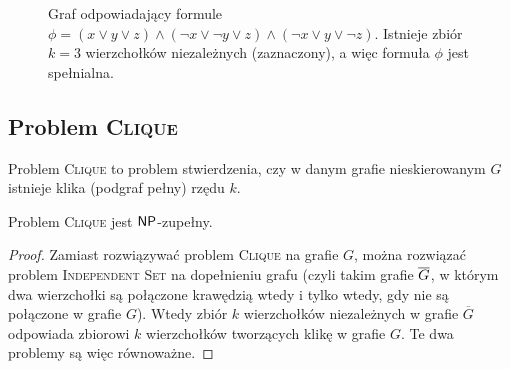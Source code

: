 \begin{figure}[H]
    \centering
    \SetCoordinates[xAngle=-30,yLength=1.2,xLength=1]

    \caption{Graf odpowiadający formule $\phi = (x \lor y \lor z) \land (\neg x \lor \neg y \lor z) \land (\neg x \lor y \lor \neg z)$. Istnieje zbiór $k = 3$ wierzchołków niezależnych (zaznaczony), a więc formuła $\phi$ jest spełnialna.}
\end{figure}

\subsection{Problem \textsc{Clique}}

Problem \textsc{Clique} to problem stwierdzenia, czy w danym grafie nieskierowanym $G$ istnieje klika (podgraf pełny) rzędu $k$.

\begin{theorem}
    Problem \textsc{Clique} jest $\textsf{NP}$-zupełny.
\end{theorem}
\begin{proof}
    Zamiast rozwiązywać problem \textsc{Clique} na grafie $G$, można rozwiązać problem \textsc{Independent Set} na dopełnieniu grafu (czyli takim grafie $\overline{G}$, w którym dwa wierzchołki są połączone krawędzią wtedy i tylko wtedy, gdy nie są połączone w grafie $G$). Wtedy zbiór $k$ wierzchołków niezależnych w grafie $\overline{G}$ odpowiada zbiorowi $k$ wierzchołków tworzących klikę w grafie $G$. Te dwa problemy są więc równoważne.
\end{proof}

